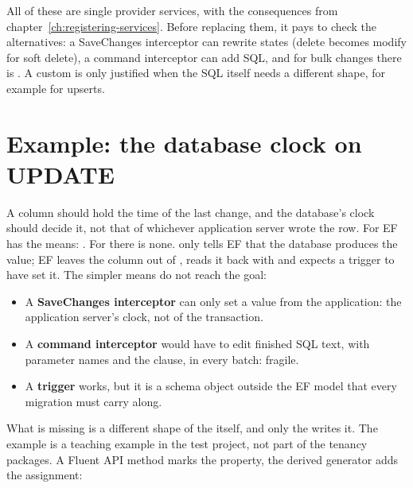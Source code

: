All of these are single provider services, with the consequences from
chapter~\ref{ch:registering-services}. Before replacing them, it pays to check the
alternatives: a SaveChanges interceptor can rewrite states (delete becomes modify for soft
delete), a command interceptor can add SQL, and for bulk changes there is
. A custom
 is only justified when the SQL itself
needs a different shape, for example  for upserts.

\section{Example: the database clock on UPDATE}

A column  should hold the time of the last change, and the
database's clock should decide it, not that of whichever application server wrote the row. For
 EF has the means: .
For  there is none. 
only tells EF that the database produces the value; EF leaves the column out of ,
reads it back with  and expects a trigger to have set it. The simpler means do
not reach the goal:

\begin{itemize}
  \item A \textbf{SaveChanges interceptor} can only set a value from the application: the
    application server's clock, not  of the transaction.
  \item A \textbf{command interceptor} would have to edit finished SQL text, with parameter
    names and the  clause, in every batch: fragile.
  \item A \textbf{trigger} works, but it is a schema object outside the EF model that every
    migration must carry along.
\end{itemize}

What is missing is a different shape of the  itself, and only the
 writes it. The example is a teaching
example in the test project, not part of the tenancy packages. A Fluent API method marks the
property, the derived generator adds the assignment:


